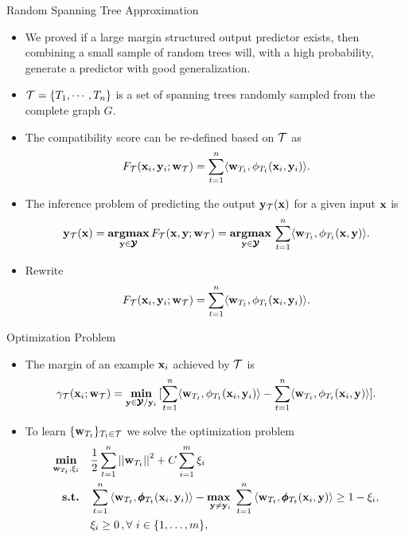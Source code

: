 \documentclass[first=dgreen,second=purple,logo=yellowexc]{aaltoslides}
\begin{document}
%
\begin{frame}{Random Spanning Tree Approximation}
	\begin{itemize}
		\item We proved if a large margin structured output predictor exists, then combining a small sample of random trees will, with a high probability, generate a predictor with good generalization.
		\item $\mathcal{T}=\{T_1,\cdots,T_n\}$ is a set of spanning trees randomly sampled from the complete graph $G$.
		\item The compatibility score can be re-defined based on $\mathcal{T}$ as
		\begin{align*}
			F_{\mathcal{T}}(\mathbf {x}_i,\mathbf {y}_i;\mathbf {w}_{\mathcal{T}}) = \sum_{t=1}^{n}\langle \mathbf {w}_{T_t}, \phi_{T_t}(\mathbf {x}_i,\mathbf {y}_i) \rangle.
		\end{align*}
		\item The inference problem of predicting the output $\mathbf {y}_{\mathcal{T}}(\mathbf {x})$ for a given input $\mathbf {x}$ is 
		\begin{align*}
			\mathbf {y}_{\mathcal{T}}(\mathbf {x}) = \underset{\mathbf {y}\in\pmb {\mathcal{Y}}}{\textbf{argmax}}\,F_{\mathcal{T}}(\mathbf {x},\mathbf {y};\mathbf {w}_{\mathcal{T}})=\underset{\mathbf {y}\in\pmb {\mathcal{Y}}}{\textbf{argmax}}\,\sum_{t=1}^{n}\langle \mathbf {w}_{T_t}, \phi_{T_t}(\mathbf {x},\mathbf {y}) \rangle.
		\end{align*}
		\item Rewrite
		\begin{align*}
			F_{\mathcal{T}}(\mathbf {x}_i,\mathbf {y}_i;\mathbf {w}_{\mathcal{T}}) = \sum_{t=1}^{n}\langle \mathbf {w}_{T_t}, \phi_{T_t}(\mathbf {x}_i,\mathbf {y}_i) \rangle.
		\end{align*}
	\end{itemize}
\end{frame}


%
\begin{frame}{Optimization Problem}
	\begin{itemize}
		\item The margin of an example $\mathbf {x}_i$ achieved by $\mathcal{T}$ is
		\begin{align*}
		\gamma_{\mathcal{T}}(\mathbf {x}_i;\mathbf {w}_{\mathcal{T}}) = \underset{\mathbf {y}\in\pmb {\mathcal{Y}}/\mathbf {y}_i}{\textbf{min}}\,[\sum_{t=1}^{n}\langle \mathbf {w}_{T_t}, \phi_{T_t}(\mathbf {x}_i,\mathbf {y}_i) \rangle-\sum_{t=1}^{n}\langle \mathbf {w}_{T_t}, \phi_{T_t}(\mathbf {x}_i,\mathbf {y}) \rangle].
	\end{align*}
		\item To learn $\{\mathbf {w}_{T_t}\}_{T_t\in\mathcal{T}}$ we solve the optimization problem
		\begin{align*}
			\underset{\vw_{T_t},\xi_i}{\minimize} & \quad \frac{1}{2}\sum_{t=1}^{n}\norm{\vw_{T_t}}^2 + C\sum_{i=1}^{m}\xi_i\\
			\st & \quad \sum_{t=1}^{n}{ \langle \vw_{T_t}, \phib_{T_t}(\vx_i,\vy_i) \rangle} - \underset{\vy \neq \vy_i}{\maximize\ } \sum_{t=1}^{n}{\langle \vw_{T_t}, \phib_{T_t}(\vx_i,\vy) \rangle } \geq 1 -  \xi_i, \\
			& \quad \xi_i\ge0\, , \forall\ i \in \set{1,\dots,m},
		\end{align*}
	\end{itemize}
\end{frame}
\end{document}
